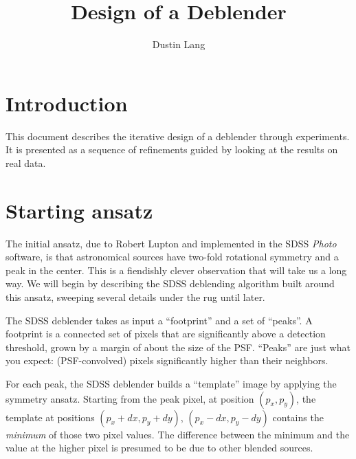 \documentclass[10pt,letter]{article}
\author{Dustin Lang}
\title{Design of a Deblender}
\begin{document}
\maketitle

\section{Introduction}

This document describes the iterative design of a deblender through
experiments.  It is presented as a sequence of refinements guided by
looking at the results on real data.


%
% 


\section{Starting ansatz}

The initial ansatz, due to Robert Lupton \cite{rhldeblend} and
implemented in the SDSS \emph{Photo} software, is that astronomical
sources have two-fold rotational symmetry and a peak in the center.
This is a fiendishly clever observation that will take us a long way.
We will begin by describing the SDSS deblending algorithm built around
this ansatz, sweeping several details under the rug until later.

The SDSS deblender takes as input a ``footprint'' and a set of
``peaks''.  A footprint is a connected set of pixels that are
significantly above a detection threshold, grown by a margin of about
the size of the PSF.  ``Peaks'' are just what you expect:
(PSF-convolved) pixels significantly higher than their neighbors.

For each peak, the SDSS deblender builds a ``template'' image by
applying the symmetry ansatz.  Starting from the peak pixel, at
position $(p_x,p_y)$, the template at positions $(p_x + dx, p_y +
dy)$, $(p_x - dx, p_y - dy)$ contains the \emph{minimum} of those two
pixel values.  The difference between the minimum and the value at the
higher pixel is presumed to be due to other blended sources.
\end{document}
